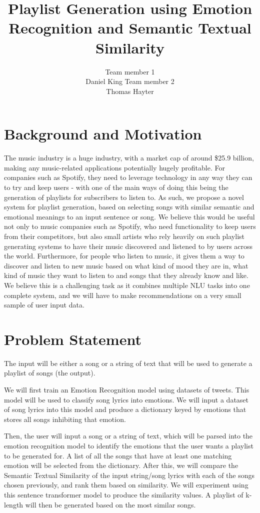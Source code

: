 \documentclass[11pt]{article}
\title{Playlist Generation using Emotion Recognition and Semantic Textual Similarity}
\author{
    Team member 1 \\
    Daniel King
    \And
    Team member 2 \\
    Thomas Hayter
}
\begin{document}
\maketitle


\section{Background and Motivation}

The music industry is a huge industry, with a market cap of around \$25.9 billion\cite{mccain_2023}, making any music-related applications potentially hugely profitable. For companies such as Spotify, they need to leverage technology in any way they can to try and keep users - with one of the main ways of doing this being the generation of playlists for subscribers to listen to. As such, we propose a novel system for playlist generation, based on selecting songs with similar semantic and emotional meanings to an input sentence or song. We believe this would be useful not only to music companies such as Spotify, who need functionality to keep users from their competitors, but also small artists who rely heavily on such playlist generating systems to have their music discovered and listened to by users across the world. Furthermore, for people who listen to music, it gives them a way to discover and listen to new music based on what kind of mood they are in, what kind of music they want to listen to and songs that they already know and like. We believe this is a challenging task as it combines multiple NLU tasks into one complete system, and we will have to make recommendations on a very small sample of user input data.

\section{Problem Statement}

The input will be either a song or a string of text that will be used to generate a playlist of songs (the output).

We will first train an Emotion Recognition model using datasets of tweets\cite{gupta_2021}\cite{pandey_2022}. This model will be used to classify song lyrics into emotions. We will input a dataset of song lyrics\cite{shah_2021} into this model and produce a dictionary keyed by emotions that stores all songs inhibiting that emotion.

Then, the user will input a song or a string of text, which will be parsed into the emotion recognition model to identify the emotions that the user wants a playlist to be generated for. A list of all the songs that have at least one matching emotion will be selected from the dictionary. After this, we will compare the Semantic Textual Similarity of the input string/song lyrics with each of the songs chosen previously, and rank them based on similarity. We will experiment using this\cite{sentence-transformer} sentence transformer model to produce the similarity values. A playlist of k-length will then be generated based on the most similar songs.
\end{document}
